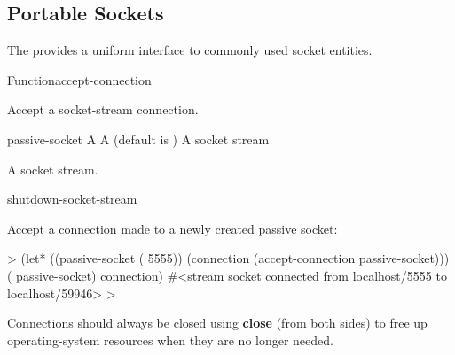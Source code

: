 \documentclass[10pt,twoside,english,pdftex]{article}
\begin{document}

\T\markright{}%
\T\pagestyle{plain}
\T\clearpage
\W{}
\T\pagestyle{fancy}
\T\thispagestyle{fancybottom}
\T\global\def\fnlastname{ }%
\subsection{Portable Sockets}
\label{sec:portablesockets}%

%
%
%
The   provides a uniform interface to
commonly used socket entities.

\W\entities
\T\clearpage


\begin{functiondoc}{Function}{accept-connection}{
     
    \returns{} } 
%
%
%

\fnsyntax

\fnpurpose Accept a socket-stream connection.

\fnpackage {}

\fnmodule {}

\fnargs
\begin{args}{passive-socket}
 A 
\arg[wait] A  (default is )
 A socket stream
\end{args}

\fnreturns A socket stream.

\begin{alsos}{shutdown-socket-stream}
\end{alsos}

%
%
\fnexample
Accept a connection made to a newly created passive socket:
%
\W\supp
\begin{example}
  > (let* ((passive-socket ( 5555))
           (connection (accept-connection passive-socket)))
       ( passive-socket)
       connection)
  #<stream socket connected from localhost/5555 to localhost/59946>
  >
\end{example}

\fnnote Connections should always be closed using \textbf{close}
(from both sides) to free up operating-system resources when they are
no longer needed.

\end{functiondoc}
\end{document}

